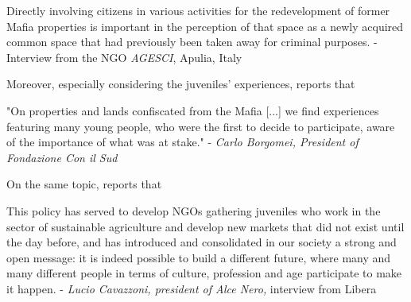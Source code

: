 \documentclass[12pt]{article}
\theoremstyle{plain}
\theoremstyle{plain}
\theoremstyle{plain}
\theoremstyle{definition}
\theoremstyle{plain}
\theoremstyle{definition}
\theoremstyle{plain}
\theoremstyle{remark}
\theoremstyle{definition}
\theoremstyle{definition}
\theoremstyle{plain}
\begin{document}
\vspace{0.5cm}
\footnotesize{
	Directly involving citizens in various activities for the redevelopment of former Mafia properties is important in the perception of that space as a newly acquired common space that had previously been taken away for criminal purposes. 
	- Interview from the NGO \emph{AGESCI}, Apulia, Italy} \par
\vspace{0.5cm}

\normalsize
Moreover, especially considering the juveniles' experiences, \citet{nazzaro_il_2021} reports that \par

\vspace{0.5cm}
\footnotesize"On properties and lands confiscated from the Mafia [...] we find experiences featuring many young people, who were the first to decide to participate, aware of the importance of what was at stake."  - \emph{Carlo Borgomei, President of Fondazione Con il Sud}
\vspace{0.6cm}

\normalsize
On the same topic, \citet{falcone_beneitalia_2016} reports that \par

\vspace{0.5cm}
\footnotesize{
	This policy has served to develop NGOs gathering juveniles who work in the sector of sustainable agriculture and develop new markets that did not exist until the day before, and has introduced and consolidated in our society a strong and open message: it is indeed possible to build a different future, where many and many different people in terms of culture, profession and age participate to make it happen. - \emph{Lucio Cavazzoni, president of Alce Nero,} interview from Libera} \par
	\vspace{0.5cm}
	\normalsize 		
\end{document}

